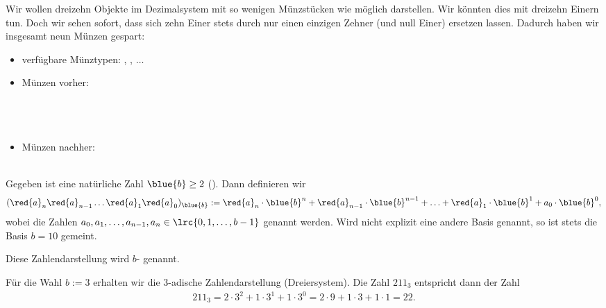 \begin{myexample}
  Wir wollen dreizehn Objekte im Dezimalsystem mit so wenigen Münzstücken wie möglich darstellen. Wir könnten dies mit
  dreizehn Einern tun. Doch wir sehen sofort, dass sich zehn Einer stets durch nur einen einzigen Zehner (und null
  Einer) ersetzen lassen. Dadurch haben wir insgesamt neun Münzen gespart:
  \begin{itemize}
  \item verfügbare Münztypen: , , $\ldots$
    \item Münzen vorher:\\
    \\
    \\
    \\
    \item Münzen nachher:\\
    \\
\end{itemize}
\end{myexample}

\begin{mydefinition}
  Gegeben ist eine natürliche Zahl $\blue{b}\geq 2$ (). Dann definieren wir
   \begin{align*}
     (\red{a}_{n}\red{a}_{n-1}\ldots \red{a}_{1}\red{a}_{0})_{\blue{b}} := \red{a}_n\cdot \blue{b}^n + \red{a}_{n-1}\cdot \blue{b}^{n-1} + \ldots +\red{a}_1\cdot \blue{b}^1 + a_0\cdot
     \blue{b}^0,
   \end{align*}
 wobei die Zahlen $a_{0}, a_{1},\ldots, a_{n-1}, a_{n}\in\lrc{0,1,\ldots,b-1}$  genannt werden. Wird
 nicht explizit eine andere Basis genannt, so ist stets die Basis $b=10$ gemeint.

 Diese Zahlendarstellung wird $b$- genannt.
\end{mydefinition}

\begin{myexample}
  Für die Wahl $b:=3$ erhalten wir die $3$-adische Zahlendarstellung (Dreiersystem). Die Zahl $211_3$ entspricht dann der Zahl
  \begin{align*}
    211_3 = 2\cdot 3^2 + 1\cdot 3^1 + 1\cdot 3^0 = 2\cdot 9 + 1\cdot 3 + 1\cdot 1 = 22.
  \end{align*}
\end{myexample}


